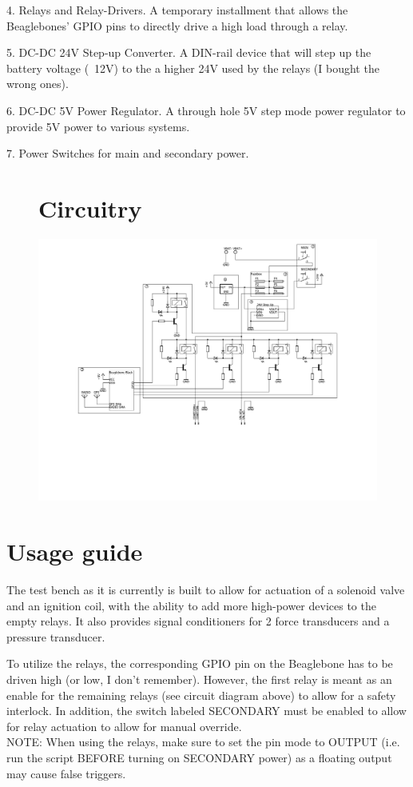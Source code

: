\documentclass[12pt,article]{memoir}
\begin{document}
4. Relays and Relay-Drivers. A temporary installment that allows the Beaglebones' GPIO pins to directly drive a high load through a relay.

5. DC-DC 24V Step-up Converter. A DIN-rail device that will step up the battery voltage (~12V) to the a higher 24V used by the relays (I bought the wrong ones).

6. DC-DC 5V Power Regulator. A through hole 5V step mode power regulator to provide 5V power to various systems.

7. Power Switches for main and secondary power.

\begin{figure} %
	\section{Circuitry}
	\centering
	\includegraphics[width=10in]{EI00002_schematic.pdf} %
\end{figure}

\newpage
\section{Usage guide}
The test bench as it is currently is built to allow for actuation of a solenoid valve and an ignition coil, with the ability to add more high-power devices to the empty relays. It also provides signal conditioners for 2 force transducers and a pressure transducer.

To utilize the relays, the corresponding GPIO pin on the Beaglebone has to be driven high (or low, I don't remember). However, the first relay is meant as an enable for the remaining relays (see circuit diagram above) to allow for a safety interlock. In addition, the switch labeled SECONDARY must be enabled to allow for relay actuation to allow for manual override.\\
NOTE: When using the relays, make sure to set the pin mode to OUTPUT (i.e. run the script BEFORE turning on SECONDARY power) as a floating output may cause false triggers.
\end{document}
